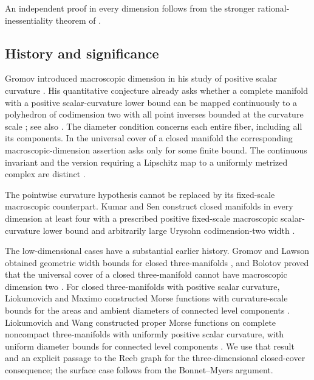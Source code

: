 An independent proof in every dimension follows from the stronger
rational-inessentiality theorem of
\citet[Theorem~1.1 and Corollary~1.2]{openai2026RationalInessentiality}.

\subsection{History and significance}

Gromov introduced macroscopic dimension in his study of positive scalar
curvature \citep[\S2]{gromov1996}. His quantitative conjecture already asks
whether a complete manifold with a positive scalar-curvature lower bound
can be mapped continuously to a polyhedron of codimension two with all
point inverses bounded at the curvature scale
\citep[\S\(2\frac12\)]{gromov1996}; see also
\citep[p.~3180, Comments after Conjecture~3.2]{gromov2019Mean}.
The diameter condition concerns each entire fiber, including all its
components. In the universal cover of a closed manifold the corresponding
macroscopic-dimension assertion asks only for some finite bound.
The continuous invariant and the version requiring a Lipschitz map to a
uniformly metrized complex are distinct
\citep[Definitions~1.1--1.2]{dranishnikov2014}.

The pointwise curvature hypothesis cannot be replaced by its fixed-scale
macroscopic counterpart. Kumar and Sen construct closed manifolds in
every dimension at least four with a prescribed positive fixed-scale
macroscopic scalar-curvature lower bound and arbitrarily large
Urysohn codimension-two width \citep[Theorem~A]{kumarSen2026Width}.

The low-dimensional cases have a substantial earlier history.
Gromov and Lawson obtained geometric width bounds for closed three-manifolds
\citep[Corollary~10.11]{gromovLawson1983}, and Bolotov proved that the
universal cover of a closed three-manifold cannot have macroscopic
dimension two \citep{bolotov2003}.
For closed three-manifolds with positive scalar curvature, Liokumovich
and Maximo constructed Morse functions with curvature-scale bounds for
the areas and ambient diameters of connected level components
\citep[Theorem~1.1]{liokumovichMaximo2023}.
Liokumovich and Wang constructed proper Morse functions on
complete noncompact three-manifolds with uniformly positive scalar
curvature, with uniform diameter bounds for connected level components
\citep[Theorem~1.1]{liokumovichWang2023}.
We use that result and an explicit passage to the Reeb graph for the
three-dimensional closed-cover consequence; the surface case follows
from the Bonnet--Myers argument.

